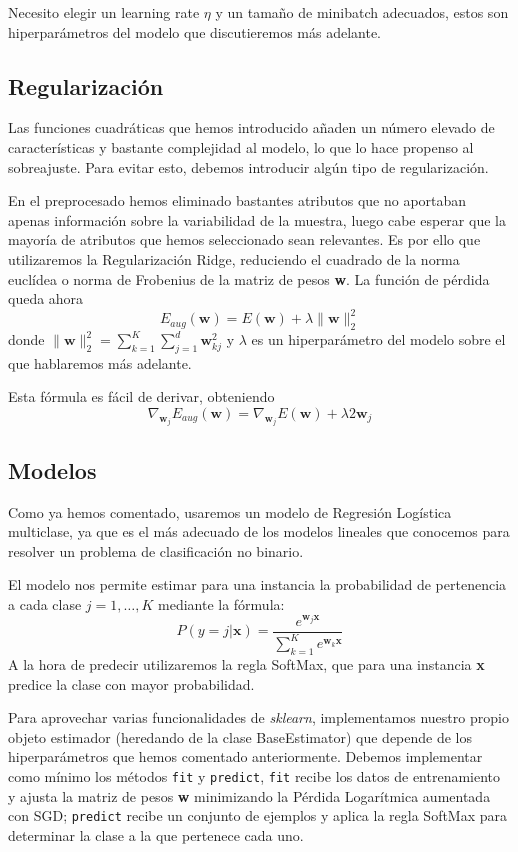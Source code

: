 \documentclass[a4]{article}
\begin{document}
Necesito elegir un learning rate $\eta$ y un tamaño de minibatch
adecuados, estos son hiperparámetros del modelo que discutieremos más
adelante.

\subsection{Regularización}

Las funciones cuadráticas que hemos introducido añaden un número
elevado de características y bastante complejidad al modelo, lo que lo
hace propenso al sobreajuste. Para evitar esto, debemos introducir
algún tipo de regularización.

En el preprocesado hemos eliminado bastantes atributos que no
aportaban apenas información sobre la variabilidad de la muestra,
luego cabe esperar que la mayoría de atributos que hemos seleccionado
sean relevantes. Es por ello que utilizaremos la Regularización Ridge,
reduciendo el cuadrado de la norma euclídea o norma de Frobenius de la
matriz de pesos \textbf{w}. La función de pérdida queda ahora
\vspace{-2mm}
\[E_{aug}(\textbf{w})=E(\textbf{w})+\lambda
  \|\textbf{w}\|_2^2\]\vspace{-2mm} donde
$\|\textbf{w}\|_2^2=\sum\limits_{k=1}^K\sum\limits_{j=1}^d
\textbf{w}_{kj}^2$ y $\lambda$ es un hiperparámetro del modelo sobre
el que hablaremos más adelante.

Esta fórmula es fácil de derivar, obteniendo \vspace{-2mm}
\[\nabla_{\textbf{w}_j}E_{aug}(\textbf{w})=\nabla_{\textbf{w}_j}E(\textbf{w})+\lambda 2\textbf{w}_j\]

\subsection{Modelos}

Como ya hemos comentado, usaremos un modelo de Regresión Logística
multiclase, ya que es el más adecuado de los modelos lineales que
conocemos para resolver un problema de clasificación no binario.

El modelo nos permite estimar para una instancia la probabilidad de
pertenencia a cada clase $j=1,\ldots,K$ mediante la fórmula:
\[P(y=j|\textbf{x})=\frac{e^{\textbf{w}_j \textbf{x}}}{\sum_{k=1}^K
    e^{\textbf{w}_k \textbf{x}}}\] A la hora de predecir utilizaremos
la regla SoftMax, que para una instancia \textbf{x} predice la
clase con mayor probabilidad.

Para aprovechar varias funcionalidades de \textit{sklearn},
implementamos nuestro propio objeto estimador (heredando de la clase
BaseEstimator) que depende de los hiperparámetros que hemos comentado
anteriormente. Debemos implementar como mínimo los métodos
\texttt{fit} y \texttt{predict}, \texttt{fit} recibe los datos de
entrenamiento y ajusta la matriz de pesos \textbf{w} minimizando la
Pérdida Logarítmica aumentada con SGD; \texttt{predict} recibe un
conjunto de ejemplos y aplica la regla SoftMax para determinar la
clase a la que pertenece cada uno.
\end{document}
